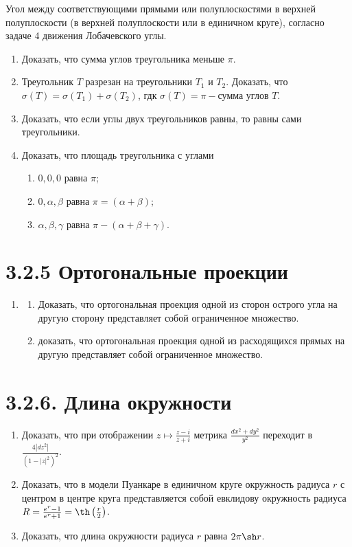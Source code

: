 	Угол между соответствующими прямыми или полуплоскостями в верхней полуплоскости (в верхней полуплоскости или в единичном круге), согласно задаче 4 движения Лобачевского углы.
	\begin{enumerate}[resume*]
		\item Доказать, что сумма углов треугольника меньше $\pi$.

		\item Треугольник $T$ разрезан на треугольники $T_1$ и $T_2$. Доказать, что $\sigma(T) = \sigma(T_1) + \sigma(T_2)$, гдк $\sigma(T) = \pi - \text{сумма углов $T$}$.

		\item Доказать, что если углы двух треугольников равны, то равны сами треугольники.

		\item Доказать, что площадь треугольника с углами 
		\begin{enumerate}
			\item $0, 0, 0$ равна $\pi$;
			\item $0, \alpha, \beta$ равна $\pi = (\alpha + \beta)$;
			\item$\alpha, \beta, \gamma$ равна $\pi - (\alpha + \beta + \gamma)$.
		\end{enumerate}
	\end{enumerate}
	\section{3.2.5 Ортогональные проекции}
	\begin{enumerate}[resume*]
		\item
		\begin{enumerate}
			\item Доказать, что ортогональная проекция одной из сторон острого угла на другую сторону представляет собой ограниченное множество.

			\item доказать, что ортогональная проекция одной из расходящихся прямых на другую представляет собой ограниченное множество.
		\end{enumerate}
	\end{enumerate}
	\section{3.2.6. Длина окружности}
	\begin{enumerate}[resume*]
		\item Доказать, что при отображении $z \mapsto \frac{z-i}{z+i}$ метрика $\frac{dx^2 + dy^2}{y^2}$ переходит в $\frac{4|dz^2|}{(1-|z|^2)^2}$.

		\item Доказать, что в модели Пуанкаре в единичном круге окружность радиуса $r$ с центром в центре круга представляется собой евклидову окружность радиуса $R = \frac{e^r - 1}{e^r + 1} = \th\left( \frac{r}{2} \right)$.

		\item Доказать, что длина окружности радиуса $r$ равна $2 \pi \sh r$.
	\end{enumerate}

